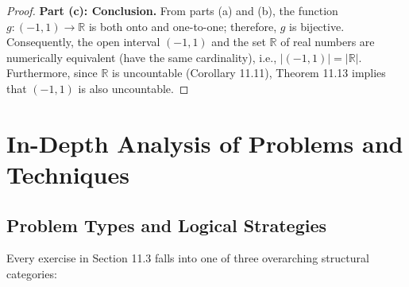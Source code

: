 \documentclass[11pt, letterpaper]{article}
\theoremstyle{definition}
\theoremstyle{remark}
\begin{document}
\begin{proof}
\textbf{Part (c): Conclusion.}
From parts (a) and (b), the function $g : (-1, 1) \to \mathbb{R}$ is both onto and one-to-one; therefore, $g$ is bijective. Consequently, the open interval $(-1, 1)$ and the set $\mathbb{R}$ of real numbers are numerically equivalent (have the same cardinality), i.e., $|(-1, 1)| = |\mathbb{R}|$. Furthermore, since $\mathbb{R}$ is uncountable (Corollary 11.11), Theorem 11.13 implies that $(-1, 1)$ is also uncountable.
\end{proof}

\section{In-Depth Analysis of Problems and Techniques}

\subsection{Problem Types and Logical Strategies}

Every exercise in Section 11.3 falls into one of three overarching structural categories:
\end{document}
